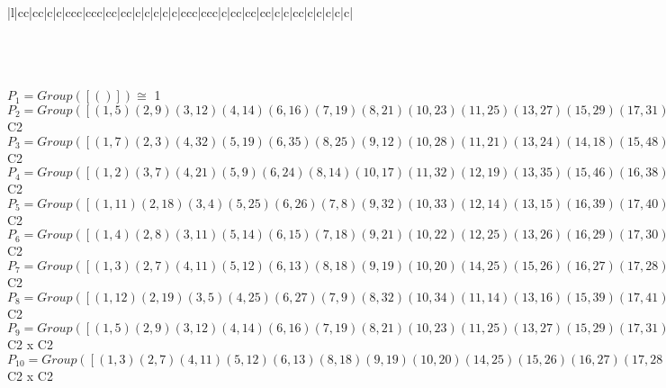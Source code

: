 \documentclass[varwidth=\maxdimen,border=10]{standalone}
\begin{document}
\begin{tabular}
\begin{array}{|l|cc|cc|c|c|ccc|ccc|cc|cc|c|c|c|c|c|ccc|ccc|c|cc|cc|cc|c|c|cc|c|c|c|c|c|}
\end{array}\)\\
\ \\
\ \\
$P_{1} = Group( [ () ] )\cong$ 1\ \\
$P_{2} = Group( [ ( 1, 5)( 2, 9)( 3,12)( 4,14)( 6,16)( 7,19)( 8,21)(10,23)(11,25)(13,27)(15,29)(17,31)(18,32)(20,34)(22,36)(24,38)(26,39)(28,41)(30,42)(33,43)(35,45)(37,46)(40,47)(44,48) ] )\cong$ C2\ \\
$P_{3} = Group( [ ( 1, 7)( 2, 3)( 4,32)( 5,19)( 6,35)( 8,25)( 9,12)(10,28)(11,21)(13,24)(14,18)(15,48)(16,45)(17,20)(22,47)(23,41)(26,46)(27,38)(29,44)(30,43)(31,34)(33,42)(36,40)(37,39) ] )\cong$ C2\ \\
$P_{4} = Group( [ ( 1, 2)( 3, 7)( 4,21)( 5, 9)( 6,24)( 8,14)(10,17)(11,32)(12,19)(13,35)(15,46)(16,38)(18,25)(20,28)(22,42)(23,31)(26,48)(27,45)(29,37)(30,36)(33,47)(34,41)(39,44)(40,43) ] )\cong$ C2\ \\
$P_{5} = Group( [ ( 1,11)( 2,18)( 3, 4)( 5,25)( 6,26)( 7, 8)( 9,32)(10,33)(12,14)(13,15)(16,39)(17,40)(19,21)(20,22)(23,43)(24,44)(27,29)(28,30)(31,47)(34,36)(35,37)(38,48)(41,42)(45,46) ] )\cong$ C2\ \\
$P_{6} = Group( [ ( 1, 4)( 2, 8)( 3,11)( 5,14)( 6,15)( 7,18)( 9,21)(10,22)(12,25)(13,26)(16,29)(17,30)(19,32)(20,33)(23,36)(24,37)(27,39)(28,40)(31,42)(34,43)(35,44)(38,46)(41,47)(45,48) ] )\cong$ C2\ \\
$P_{7} = Group( [ ( 1, 3)( 2, 7)( 4,11)( 5,12)( 6,13)( 8,18)( 9,19)(10,20)(14,25)(15,26)(16,27)(17,28)(21,32)(22,33)(23,34)(24,35)(29,39)(30,40)(31,41)(36,43)(37,44)(38,45)(42,47)(46,48) ] )\cong$ C2\ \\
$P_{8} = Group( [ ( 1,12)( 2,19)( 3, 5)( 4,25)( 6,27)( 7, 9)( 8,32)(10,34)(11,14)(13,16)(15,39)(17,41)(18,21)(20,23)(22,43)(24,45)(26,29)(28,31)(30,47)(33,36)(35,38)(37,48)(40,42)(44,46) ] )\cong$ C2\ \\
$P_{9} = Group( [ ( 1, 5)( 2, 9)( 3,12)( 4,14)( 6,16)( 7,19)( 8,21)(10,23)(11,25)(13,27)(15,29)(17,31)(18,32)(20,34)(22,36)(24,38)(26,39)(28,41)(30,42)(33,43)(35,45)(37,46)(40,47)(44,48), ( 1, 7)( 2, 3)( 4,32)( 5,19)( 6,35)( 8,25)( 9,12)(10,28)(11,21)(13,24)(14,18)(15,48)(16,45)(17,20)(22,47)(23,41)(26,46)(27,38)(29,44)(30,43)(31,34)(33,42)(36,40)(37,39) ] )\cong$ C2 x C2\ \\
$P_{10} = Group( [ ( 1, 3)( 2, 7)( 4,11)( 5,12)( 6,13)( 8,18)( 9,19)(10,20)(14,25)(15,26)(16,27)(17,28)(21,32)(22,33)(23,34)(24,35)(29,39)(30,40)(31,41)(36,43)(37,44)(38,45)(42,47)(46,48), ( 1, 2)( 3, 7)( 4,21)( 5, 9)( 6,24)( 8,14)(10,17)(11,32)(12,19)(13,35)(15,46)(16,38)(18,25)(20,28)(22,42)(23,31)(26,48)(27,45)(29,37)(30,36)(33,47)(34,41)(39,44)(40,43) ] )\cong$ C2 x C2\ \\

\end{tabular}
\end{document}
